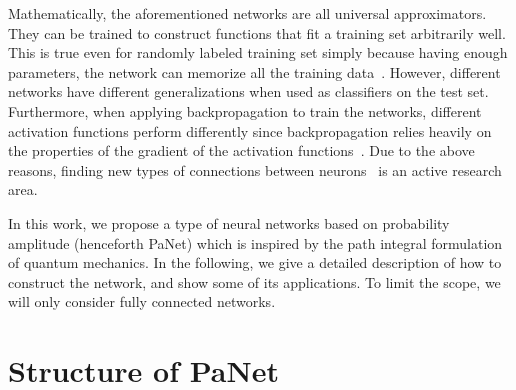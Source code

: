 \documentclass{article}
\begin{document}
Mathematically, the aforementioned networks are all universal approximators.
They can be trained to construct functions that fit a training set
arbitrarily well. This is true even for randomly labeled training set simply
because having enough parameters, the network can memorize all the training
data~\cite{zhang}. However, different networks have different
generalizations when used as classifiers on the test set. Furthermore, when
applying backpropagation to train the networks, different activation
functions perform differently since backpropagation relies heavily on the
properties of the gradient of the activation functions~\cite{glorot}. Due to
the above reasons, finding new types of connections between
neurons~\cite{maas, he, xu, elu, capsnet, unitary, minemoto, dqn, dcn} is an
active research area.

In this work, we propose a type of neural networks based on probability
amplitude (henceforth PaNet) which is inspired by the path integral
formulation~\cite{feynman} of quantum mechanics. In the following, we give a
detailed description of how to construct the network, and show some of its
applications. To limit the scope, we will only consider fully connected
networks.

\section{Structure of  PaNet}
\end{document}
